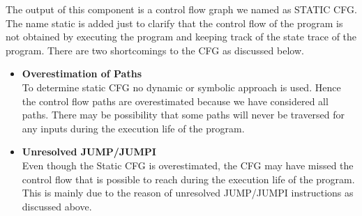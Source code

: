 The output of this component is a control flow graph we named as STATIC CFG. The name static is added just to clarify that the control flow of the program is not obtained by executing the program and keeping track of the state trace of the program. There are two shortcomings to the CFG as discussed below.
\begin{itemize}
    \item \textbf{Overestimation of Paths}\\
    To determine static CFG no dynamic or symbolic approach is used. Hence the control flow paths are overestimated because we have considered all paths. There may be possibility that some paths will never be traversed for any inputs during the execution life of the program.
    \item \textbf{Unresolved JUMP/JUMPI}\\
    Even though the Static CFG is overestimated, the CFG may have missed the control flow that is possible to reach during the execution life of the program. This is mainly due to the reason of unresolved JUMP/JUMPI instructions as discussed above.
\end{itemize}
